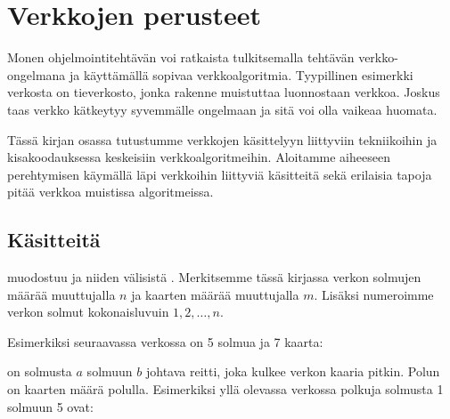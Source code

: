 \chapter{Verkkojen perusteet}

Monen ohjelmointitehtävän voi ratkaista tulkitsemalla
tehtävän verkko-on\-gel\-ma\-na ja käyttämällä
sopivaa verkkoalgoritmia.
Tyypillinen esimerkki verkosta on tieverkosto,
jonka rakenne muistuttaa luonnostaan verkkoa.
Joskus taas verkko kätkeytyy syvemmälle ongelmaan
ja sitä voi olla vaikeaa huomata.

Tässä kirjan osassa tutustumme verkkojen käsittelyyn
liittyviin tekniikoihin ja kisakoodauksessa
keskeisiin verkkoalgoritmeihin.
Aloitamme aiheeseen perehtymisen
käymällä läpi verkkoihin liittyviä käsitteitä
sekä erilaisia tapoja pitää verkkoa muistissa algoritmeissa.

\section{Käsitteitä}


 muodostuu 
ja niiden välisistä .
Merkitsemme tässä kirjassa
verkon solmujen määrää
muuttujalla $n$ ja kaarten määrää muuttujalla $m$.
Lisäksi numeroimme verkon solmut kokonaisluvuin
$1,2,\ldots,n$.

Esimerkiksi seuraavassa verkossa on 5 solmua ja 7 kaarta:

\begin{center}
\end{center}


 on solmusta $a$ solmuun $b$
johtava reitti, joka kulkee verkon kaaria pitkin.
Polun  on kaarten määrä polulla.
Esimerkiksi yllä olevassa verkossa
polkuja solmusta 1 solmuun 5 ovat:

